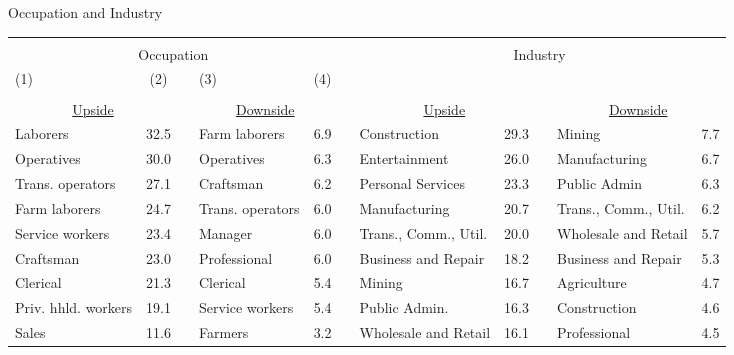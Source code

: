 \begin{center}
\scriptsize
\begin{threeparttable}
\caption{Occupation and Industry} \label{OCCIND}
\begin{tabular}{lcclcclcclc}
\hline \hline \\[-1ex]
                            \multicolumn{5}{c}{Occupation} &&\multicolumn{5}{c}{Industry} \\
                            (1) & (2) && (3) & (4) \\[.5em]
\hline\\[-1ex]
                            \multicolumn{2}{c}{\underline{Upside}}&&\multicolumn{2}{c}{\underline{Downside}}&&\multicolumn{2}{c}{\underline{Upside}}&&\multicolumn{2}{c}{\underline{Downside}} \\
                            Laborers				  		& 32.5	&&	Farm laborers	    &	6.9         && Construction	        & 29.3    &&    Mining	             & 7.7 \\[1ex]
                            Operatives						& 30.0  &&  Operatives	        &	6.3         && Entertainment     	& 26.0    &&    Manufacturing	     & 6.7 \\[1ex]
                            Trans. operators   		        & 27.1  &&  Craftsman	        &	6.2         && Personal Services    & 23.3    &&    Public Admin	     & 6.3 \\[1ex]
                            Farm laborers					& 24.7  &&  Trans. operators    &	6.0         && Manufacturing	    & 20.7    &&    Trans., Comm., Util. & 6.2 \\[1ex]
                            Service workers				    & 23.4  &&  Manager	            &	6.0         && Trans., Comm., Util.	& 20.0    &&    Wholesale and Retail & 5.7 \\[1ex]
                            Craftsman						& 23.0  &&  Professional	    &	6.0         && Business and Repair  & 18.2    &&    Business and Repair	 & 5.3 \\[1ex]
                            Clerical						& 21.3  &&  Clerical      	    &	5.4         && Mining	            & 16.7    &&    Agriculture	         & 4.7 \\[1ex]
                            Priv. hhld. workers  	        & 19.1  &&  Service workers	    &	5.4         && Public Admin.       	& 16.3    &&    Construction	     & 4.6 \\[1ex]
                            Sales							& 11.6  &&  Farmers	            &	3.2         && Wholesale and Retail	& 16.1    &&    Professional	     & 4.5 \\[1ex]

\end{tabular}
\end{threeparttable}
\end{center}
